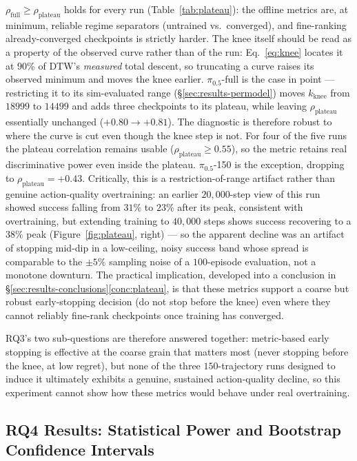 \documentclass[english,12pt,a4paper,pdftex,elec,utf8]{aaltothesis}
\begin{document}
$\rho_{\mathrm{full}}\ge\rho_{\mathrm{plateau}}$ holds for every run (Table~\ref{tab:plateau}): the offline metrics are, at minimum, reliable regime separators (untrained vs.\ converged), and fine-ranking already-converged checkpoints is strictly harder. The knee itself should be read as a property of the observed curve rather than of the run: Eq.~\ref{eq:knee} locates it at $90\%$ of DTW's \emph{measured} total descent, so truncating a curve raises its observed minimum and moves the knee earlier. $\pi_{0.5}$-full is the case in point --- restricting it to its sim-evaluated range (\S\ref{sec:results-permodel}) moves $k_{\mathrm{knee}}$ from $18999$ to $14499$ and adds three checkpoints to its plateau, while leaving $\rho_{\mathrm{plateau}}$ essentially unchanged ($+0.80\to+0.81$). The diagnostic is therefore robust to where the curve is cut even though the knee step is not. For four of the five runs the plateau correlation remains usable ($\rho_{\mathrm{plateau}}\ge0.55$), so the metric retains real discriminative power even inside the plateau. $\pi_{0.5}$-150 is the exception, dropping to
$\rho_{\mathrm{plateau}}=+0.43$. Critically, this is a restriction-of-range artifact rather than genuine action-quality overtraining: an earlier $20{,}000$-step view of this run showed success falling from $31\%$ to $23\%$ after its peak, consistent with overtraining, but extending training to $40{,}000$ steps shows success recovering to a $38\%$ peak (Figure~\ref{fig:plateau}, right) --- so the apparent decline was an artifact of stopping mid-dip in a low-ceiling, noisy success band whose spread is comparable to the $\pm5\%$ sampling noise of a $100$-episode evaluation, not a monotone downturn. The practical implication, developed into a conclusion in \S\ref{sec:results-conclusions}\ref{conc:plateau}, is that these metrics support a coarse but robust early-stopping decision (do not stop before the knee) even where they cannot reliably fine-rank checkpoints once training has converged.

RQ3's two sub-questions are therefore answered together: metric-based early stopping is effective at the coarse grain that matters most (never stopping before the knee, at low regret), but none of the three $150$-trajectory runs designed to induce it ultimately exhibits a genuine, sustained action-quality decline, so this experiment cannot show how these metrics would behave under real overtraining.

\subsection{RQ4 Results: Statistical Power and Bootstrap Confidence Intervals}
\label{sec:results-bootstrap}
\end{document}
